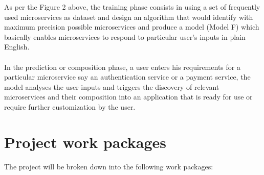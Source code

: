 \documentclass{article}
\begin{document}
\pagebreak

\noindent As per the Figure 2 above, the training phase consists in using a set of frequently used microservices as dataset and design an algorithm that would identify with maximum precision possible microservices and produce a model (Model F) which basically enables microservices to respond to particular user’s inputs in plain English. 
\\
\\
\noindent In the prediction or composition phase, a user enters his requirements for a particular microservice say an authentication service or a payment service, the model analyses the user inputs and triggers the discovery of relevant microservices and their composition into an application that is ready for use or require further customization by the user.


\section{Project work packages}

The project will be broken down into the following work packages:
\end{document}
